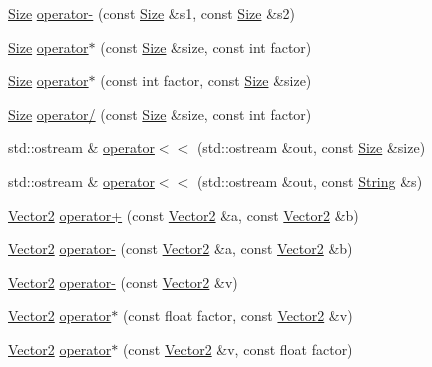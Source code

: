 \begin{DoxyCompactItemize}
\item 
\hyperlink{classprism_1_1_size}{Size} \hyperlink{namespaceprism_ab170e3ca42d85a6766cbc7950ddfb0c4}{operator-\/} (const \hyperlink{classprism_1_1_size}{Size} \&s1, const \hyperlink{classprism_1_1_size}{Size} \&s2)
\item 
\hyperlink{classprism_1_1_size}{Size} \hyperlink{namespaceprism_a3d8e53ee3208e09e8736a77be3f485c9}{operator$\ast$} (const \hyperlink{classprism_1_1_size}{Size} \&size, const int factor)
\item 
\hyperlink{classprism_1_1_size}{Size} \hyperlink{namespaceprism_acd79758984cccce0dddfb459af65f6e1}{operator$\ast$} (const int factor, const \hyperlink{classprism_1_1_size}{Size} \&size)
\item 
\hyperlink{classprism_1_1_size}{Size} \hyperlink{namespaceprism_ad7e100bd6b1730deaab53d1218e29a67}{operator/} (const \hyperlink{classprism_1_1_size}{Size} \&size, const int factor)
\item 
std\+::ostream \& \hyperlink{namespaceprism_ad6335168e27f481d86ae42da444006d1}{operator$<$$<$} (std\+::ostream \&out, const \hyperlink{classprism_1_1_size}{Size} \&size)
\item 
std\+::ostream \& \hyperlink{namespaceprism_a0a166bbf645cc854542cc0fc50324670}{operator$<$$<$} (std\+::ostream \&out, const \hyperlink{classprism_1_1_string}{String} \&s)
\item 
\hyperlink{classprism_1_1_vector2}{Vector2} \hyperlink{namespaceprism_ae482804c32b466401a9ecdf26bc1e6de}{operator+} (const \hyperlink{classprism_1_1_vector2}{Vector2} \&a, const \hyperlink{classprism_1_1_vector2}{Vector2} \&b)
\item 
\hyperlink{classprism_1_1_vector2}{Vector2} \hyperlink{namespaceprism_a86359a88dc5245847de48575a1f969e8}{operator-\/} (const \hyperlink{classprism_1_1_vector2}{Vector2} \&a, const \hyperlink{classprism_1_1_vector2}{Vector2} \&b)
\item 
\hyperlink{classprism_1_1_vector2}{Vector2} \hyperlink{namespaceprism_a124f1081b3a9bbc441dac9927f8a0fc5}{operator-\/} (const \hyperlink{classprism_1_1_vector2}{Vector2} \&v)
\item 
\hyperlink{classprism_1_1_vector2}{Vector2} \hyperlink{namespaceprism_a6528ec4496096e8ccde186bb01fbeed3}{operator$\ast$} (const float factor, const \hyperlink{classprism_1_1_vector2}{Vector2} \&v)
\item 
\hyperlink{classprism_1_1_vector2}{Vector2} \hyperlink{namespaceprism_a1de3bc1dbc3fd33f26d580bce3520854}{operator$\ast$} (const \hyperlink{classprism_1_1_vector2}{Vector2} \&v, const float factor)

\end{DoxyCompactItemize}
